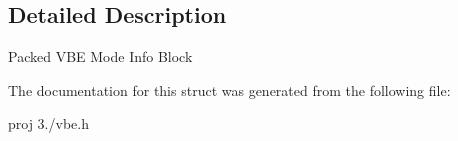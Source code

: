 \subsection{Detailed Description}
Packed V\+B\+E Mode Info Block 

The documentation for this struct was generated from the following file\+:\begin{DoxyCompactItemize}
\item 
proj 3./vbe.\+h\end{DoxyCompactItemize}
